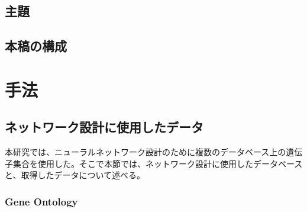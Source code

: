 \documentclass[a4paper,12pt]{jsreport}
\begin{document}
\section{主題}


\section{本稿の構成}



\chapter{手法}
\begin{comment}
\#\#\#\#\#\#\#\#\#\#\# \\
ニューラルネットワークの設計にデータベースを用いること\\
設計に用いるデータについて\\
ニューラルネットワークの設計手法について\\
実験について\\
評価手法について\\
の順で説明すること\\
\#\#\#\#\#\#\#\#\#\#\# \\
\end{comment}

\section{ネットワーク設計に使用したデータ}
本研究では、ニューラルネットワーク設計のために複数のデータベース上の遺伝子集合を使用した。そこで本節では、ネットワーク設計に使用したデータベースと、取得したデータについて述べる。

\subsection{Gene Ontology}
\begin{comment}
\#\#\#\#\#\#\#\#\#\#\# \\
・gene ontology説明\\
GO termと親子関係があるDAG構造を取ること\\
BP、CC、MFに分かれていること\\
それぞれがDAG構造をしていること\\
アノテーション情報があること\\
子用語のアノテーションは親用語のアノテーションになること\\
遺伝子集合と親子関係を抽出すること\\
\#\#\#\#\#\#\#\#\#\#\# \\
\end{comment}
\end{document}
